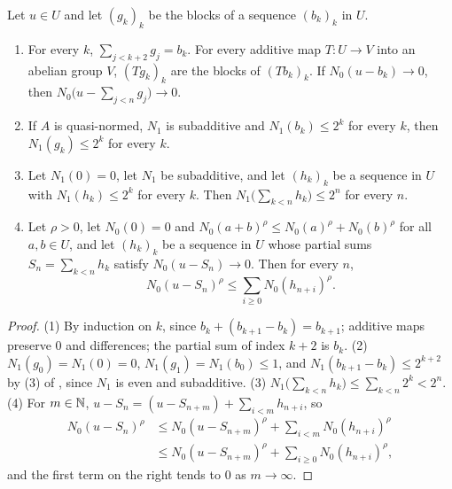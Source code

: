 \begin{lemma}
\label{lem:e-block-partial-sums}
\leanok
{}
Let $u \in U$ and let $(g_k)_k$ be the blocks of a sequence $(b_k)_k$ in $U$.
\begin{enumerate}
  \item For every $k$, $\sum_{j < k+2} g_j = b_k$. For every additive map $T : U \to V$ into an
    abelian group $V$, $(T g_k)_k$ are the blocks of $(T b_k)_k$. If $N_0(u - b_k) \to 0$, then
    $N_0\bigl(u - \sum_{j<n} g_j\bigr) \to 0$.
  \item If $A$ is quasi-normed, $N_1$ is subadditive and $N_1(b_k) \leq 2^k$ for every $k$, then
    $N_1(g_k) \leq 2^k$ for every $k$.
  \item Let $N_1(0) = 0$, let $N_1$ be subadditive, and let $(h_k)_k$ be a sequence in $U$ with
    $N_1(h_k) \leq 2^k$ for every $k$. Then $N_1\bigl(\sum_{k<n} h_k\bigr) \leq 2^n$ for every
    $n$.
  \item Let $\rho > 0$, let $N_0(0) = 0$ and $N_0(a + b)^\rho \leq N_0(a)^\rho + N_0(b)^\rho$ for
    all $a, b \in U$, and let $(h_k)_k$ be a sequence in $U$ whose partial sums
    $S_n = \sum_{k<n} h_k$ satisfy $N_0(u - S_n) \to 0$. Then for every $n$,
    \[
      N_0(u - S_n)^\rho \leq \sum_{i \geq 0} N_0(h_{n+i})^\rho .
    \]
\end{enumerate}
\end{lemma}

\begin{proof}
\leanok
{}
(1) By induction on $k$, since $b_k + (b_{k+1} - b_k) = b_{k+1}$; additive maps preserve $0$ and
differences; the partial sum of index $k + 2$ is $b_k$. (2) $N_1(g_0) = N_1(0) = 0$,
$N_1(g_1) = N_1(b_0) \leq 1$, and $N_1(b_{k+1} - b_k) \leq 2^{k+2}$ by (3) of
, since $N_1$ is even and subadditive. (3)
$N_1\bigl(\sum_{k<n} h_k\bigr) \leq \sum_{k<n} 2^k < 2^n$. (4) For $m \in \mathbb{N}$,
$u - S_n = (u - S_{n+m}) + \sum_{i<m} h_{n+i}$, so
\begin{align*}
  N_0(u - S_n)^\rho &\leq N_0(u - S_{n+m})^\rho + \sum_{i<m} N_0(h_{n+i})^\rho \\
  &\leq N_0(u - S_{n+m})^\rho + \sum_{i \geq 0} N_0(h_{n+i})^\rho ,
\end{align*}
and the first term on the right tends to $0$ as $m \to \infty$.
\end{proof}

